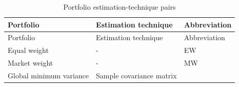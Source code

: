 \documentclass[
]{article}
\begin{document}
\begin{longtable}[]{@{}lll@{}}
\caption{\label{tab:portestpairs} Portfolio estimation-technique pairs}\tabularnewline
\toprule
\begin{minipage}[b]{0.27\columnwidth}\raggedright
Portfolio\strut
\end{minipage} & \begin{minipage}[b]{0.50\columnwidth}\raggedright
Estimation technique\strut
\end{minipage} & \begin{minipage}[b]{0.14\columnwidth}\raggedright
Abbreviation\strut
\end{minipage}\tabularnewline
\midrule
\endfirsthead
\toprule
\begin{minipage}[b]{0.27\columnwidth}\raggedright
Portfolio\strut
\end{minipage} & \begin{minipage}[b]{0.50\columnwidth}\raggedright
Estimation technique\strut
\end{minipage} & \begin{minipage}[b]{0.14\columnwidth}\raggedright
Abbreviation\strut
\end{minipage}\tabularnewline
\midrule
\endhead
\begin{minipage}[t]{0.27\columnwidth}\raggedright
Equal weight\strut
\end{minipage} & \begin{minipage}[t]{0.50\columnwidth}\raggedright
-\strut
\end{minipage} & \begin{minipage}[t]{0.14\columnwidth}\raggedright
EW\strut
\end{minipage}\tabularnewline
\begin{minipage}[t]{0.27\columnwidth}\raggedright
Market weight\strut
\end{minipage} & \begin{minipage}[t]{0.50\columnwidth}\raggedright
-\strut
\end{minipage} & \begin{minipage}[t]{0.14\columnwidth}\raggedright
MW\strut
\end{minipage}\tabularnewline
\begin{minipage}[t]{0.27\columnwidth}\raggedright
Global minimum variance\strut
\end{minipage} & \begin{minipage}[t]{0.50\columnwidth}\raggedright
Sample covariance matrix\strut
\end{minipage} & \begin{minipage}[t]{0.14\columnwidth}\raggedright

\end{minipage}
\end{longtable}
\end{document}
